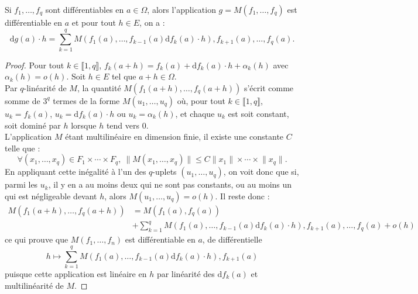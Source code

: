 \documentclass[french]{article}
\renewcommand{\d}{\text{d}}
\theoremstyle{plain}
\theoremstyle{definition}
\theoremstyle{remark}
\begin{document}
\begin{prop}%
	Si $f_1,\ldots,f_q$ sont différentiables en $a\in\Omega$, alors l'application $g=M(f_1,\ldots,f_q)$ est différentiable en $a$ et pour tout $h\in E$, on a :
	$$\d g(a)\cdot h=\sum_{k=1}^{q}M(f_1(a),\ldots,f_{k-1}(a)\d f_k(a)\cdot h),f_{k+1}(a),\ldots,f_q(a).$$
\end{prop}
\begin{proof}
	Pour tout $k\in\llbracket1,q\rrbracket$, $f_k(a+h)=f_k(a)+\d f_k(a)\cdot h+\alpha_k(h)$ avec $\alpha_k(h)=o(h)$. Soit $h\in E$ tel que $a+h\in\Omega$. \\
	Par $q$-linéarité de $M$, la quantité $M(f_1(a+h),\ldots,f_q(a+h))$ s'écrit comme somme de $3^q$ termes de la forme $M(u_1,\ldots,u_q)$ où, pour tout $k\in\llbracket1,q\rrbracket$, $u_k=f_k(a)$, $u_k=\d f_k(a)\cdot h$ ou $u_k=\alpha_k(h)$, et chaque $u_k$ est soit constant, soit dominé par $h$ lorsque $h$ tend vers $0$. \\
	L'application $M$ étant multilinéaire en dimension finie, il existe une constante $C$ telle que :
	$$\forall (x_1,\ldots,x_q)\in F_1\times\cdots\times F_q,\ \lVert M(x_1,\ldots,x_q)\rVert\leqslant C\lVert x_1\rVert\times\cdots\times\lVert x_q\rVert.$$
	En appliquant cette inégalité à l'un des $q$-uplets $(u_1,\ldots,u_q)$, on voit donc que si, parmi les $u_k$, il y en a au moins deux qui ne sont pas constants, ou au moins un qui est négligeable devant $h$, alors $M(u_1,\ldots,u_q)=o(h)$. Il reste donc :
	\begin{align*}
		M(f_1(a+h),\ldots,f_q(a+h))&=M(f_1(a),f_q(a))\\&+\sum_{k=1}^{q}M(f_1(a),\ldots,f_{k-1}(a)\d f_k(a)\cdot h),f_{k+1}(a),\ldots,f_q(a)+o(h)
	\end{align*}
	ce qui prouve que $M(f_1,\ldots,f_n)$ est différentiable en $a$, de différentielle 
	$$h\mapsto \sum_{k=1}^{q}M(f_1(a),\ldots,f_{k-1}(a)\d f_k(a)\cdot h),f_{k+1}(a)$$ puisque cette application est linéaire en $h$ par linéarité des $\d f_k(a)$ et multilinéarité de $M$.
\end{proof}
\end{document}
